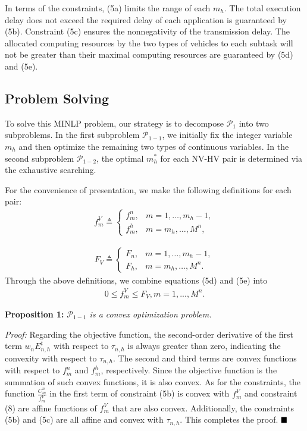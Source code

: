 \documentclass[lettersize,journal]{IEEEtran}
\begin{document}
In terms of the constraints, (5a) limits the range of each $m_h$. The total execution delay does not exceed the required delay of each application is guaranteed by (5b). Constraint (5c) ensures the nonnegativity of the transmission delay. The allocated computing resources by the two types of vehicles to each subtask will not be greater than their maximal computing resources are guaranteed by (5d) and (5e).


\subsection{Problem Solving}
To solve this MINLP problem, our strategy is to decompose $\mathcal{P}_1$ into two subproblems. In the first subproblem $\mathcal{P}_{1-1}$, we initially fix the integer variable $m_h$ and then optimize the remaining two types of continuous variables. In the second subproblem $\mathcal{P}_{1-2}$, the optimal $m_h^*$ for each NV-HV pair is determined via the exhaustive searching.

For the convenience of presentation, we make the following definitions for each pair:
\begin{align*}
f^{V}_{m} \triangleq \begin{cases} f^n_m, & m=1,\ldots, m_h-1, \\ f^h_m, & m=m_h,\ldots, M^n, \end{cases}\tag{6}\end{align*}

\begin{align*}
F_V \triangleq \begin{cases} F_n, & m=1,\ldots, m_h-1, \\ F_h, & m=m_h,\ldots, M^n. \end{cases}\tag{7}\end{align*} 
Through the above definitions, we combine equations (5d) and (5e) into
\begin{align*}
0 \leq f^{V}_{m} \leq F_V, m=1,...,M^n. \tag{8}
\end{align*}


\textbf{Proposition 1:} \textit{$\mathcal{P}_{1-1}$ is a convex optimization problem.}

\emph{Proof:} Regarding the objective function, the second-order derivative of the first term $w_nE_{n,h}^t$ with respect to $\tau_{n,h}$ is always greater than zero, indicating the convexity with respect to $\tau_{n,h}$. The second and third terms are convex functions with respect to $f^n_m$ and $f^h_m$, respectively. Since the objective function is the summation of such convex functions, it is also convex. As for the constraints, the function $\frac{C_m^n}{f^{V}_{m}}$ in the first term of constraint (5b) is convex with $f^{V}_{m}$ and constraint (8) are affine functions of $f^{V}_{m}$ that are also convex. Additionally, the constraints (5b) and (5c) are all affine and convex with $\tau_{n,h}$. This completes the proof.
$\hfill\blacksquare$
\end{document}
